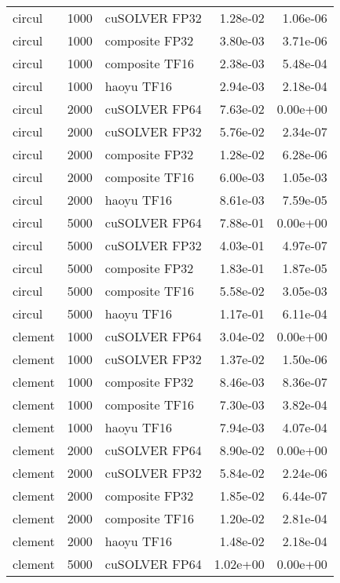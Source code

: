 \begin{table}
\begin{tabular}{lrlrr}
   circul &  1000 &  cuSOLVER FP32 &  1.28e-02 &        1.06e-06 \\
   circul &  1000 & composite FP32 &  3.80e-03 &        3.71e-06 \\
   circul &  1000 & composite TF16 &  2.38e-03 &        5.48e-04 \\
   circul &  1000 &     haoyu TF16 &  2.94e-03 &        2.18e-04 \\
   circul &  2000 &  cuSOLVER FP64 &  7.63e-02 &        0.00e+00 \\
   circul &  2000 &  cuSOLVER FP32 &  5.76e-02 &        2.34e-07 \\
   circul &  2000 & composite FP32 &  1.28e-02 &        6.28e-06 \\
   circul &  2000 & composite TF16 &  6.00e-03 &        1.05e-03 \\
   circul &  2000 &     haoyu TF16 &  8.61e-03 &        7.59e-05 \\
   circul &  5000 &  cuSOLVER FP64 &  7.88e-01 &        0.00e+00 \\
   circul &  5000 &  cuSOLVER FP32 &  4.03e-01 &        4.97e-07 \\
   circul &  5000 & composite FP32 &  1.83e-01 &        1.87e-05 \\
   circul &  5000 & composite TF16 &  5.58e-02 &        3.05e-03 \\
   circul &  5000 &     haoyu TF16 &  1.17e-01 &        6.11e-04 \\
  clement &  1000 &  cuSOLVER FP64 &  3.04e-02 &        0.00e+00 \\
  clement &  1000 &  cuSOLVER FP32 &  1.37e-02 &        1.50e-06 \\
  clement &  1000 & composite FP32 &  8.46e-03 &        8.36e-07 \\
  clement &  1000 & composite TF16 &  7.30e-03 &        3.82e-04 \\
  clement &  1000 &     haoyu TF16 &  7.94e-03 &        4.07e-04 \\
  clement &  2000 &  cuSOLVER FP64 &  8.90e-02 &        0.00e+00 \\
  clement &  2000 &  cuSOLVER FP32 &  5.84e-02 &        2.24e-06 \\
  clement &  2000 & composite FP32 &  1.85e-02 &        6.44e-07 \\
  clement &  2000 & composite TF16 &  1.20e-02 &        2.81e-04 \\
  clement &  2000 &     haoyu TF16 &  1.48e-02 &        2.18e-04 \\
  clement &  5000 &  cuSOLVER FP64 &  1.02e+00 &        0.00e+00 \\

\end{tabular}
\end{table}
